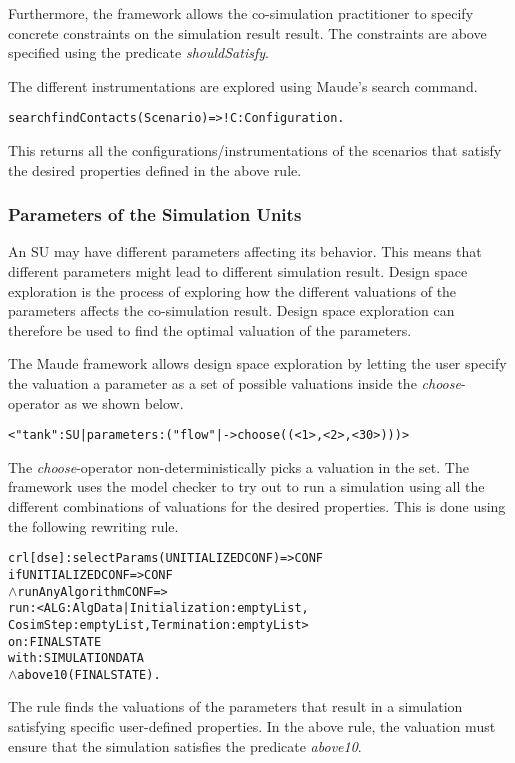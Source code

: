 Furthermore, the framework allows the co-simulation practitioner to specify concrete constraints on the simulation result result.
The constraints are above specified using the predicate \emph{shouldSatisfy}.

The different instrumentations are explored using Maude's search command.

\begin{alltt}
  \small
  search findContacts(Scenario) =>! C:Configuration .
\end{alltt}
  
This returns all the configurations/instrumentations of the scenarios that satisfy the desired properties defined in the above rule.

\subsubsection{Parameters of the Simulation Units}
An SU may have different parameters affecting its behavior.
This means that different parameters might lead to different simulation result.
Design space exploration is the process of exploring how the different valuations of the parameters affects the co-simulation result.
Design space exploration can therefore be used to find the optimal valuation of the parameters. 

The Maude framework allows design space exploration by letting the user specify the valuation a parameter as a set of possible valuations inside the \emph{choose}-operator as we shown below.
\begin{alltt}
  \small
< "tank" : SU | parameters : ("flow" |-> choose((< 1 >,< 2 >,< 30 >))) >
\end{alltt}

The \emph{choose}-operator non-deterministically picks a valuation in the set.
The framework uses the model checker to try out to run a simulation using all the different combinations of valuations for the desired properties.
This is done using the following rewriting rule.

\begin{alltt}
  \small
  crl [dse] : selectParams(UNITIALIZEDCONF) => CONF 
  if UNITIALIZEDCONF => CONF
  \(\land\) runAnyAlgorithm CONF => 
      run: < ALG : AlgData | Initialization : emptyList, 
      CosimStep : emptyList, Termination : emptyList > 
      on: FINALSTATE
      with: SIMULATIONDATA
  \(\land\) above10(FINALSTATE) .
\end{alltt}

The rule finds the valuations of the parameters that result in a simulation satisfying specific user-defined properties.
In the above rule, the valuation must ensure that the simulation satisfies the predicate \emph{above10}.

